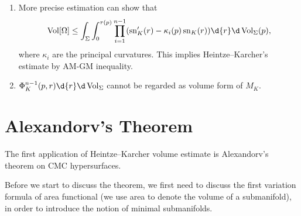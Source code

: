\begin{rem}
    \begin{enumerate}[(1)]
        \item More precise estimation can show that
        \[\Vol[\Omega]\leq\int_\Sigma\int_0^{\tau(p)}\prod_{i=1}^{n-1}(\sn'_K(r)-\kappa_i(p)\sn_K(r))\d{r}\d\Vol_\Sigma(p),\]
        where $\kappa_i$ are the principal curvatures.
        This implies Heintze--Karcher's estimate by AM-GM inequality.
        \item $\Phi_K^{n-1}(p,r)\d{r}\d\Vol_\Sigma$ cannot be regarded as volume form of $M_K$.
    \end{enumerate}
\end{rem}

\section{Alexandorv's Theorem}

The first application of Heintze--Karcher volume estimate is Alexandorv's theorem on CMC hypersurfaces.

Before we start to discuss the theorem, we first need to discuss the first variation formula of area functional (we use area to denote the volume of a submanifold), in order to introduce the notion of minimal submanifolds.

